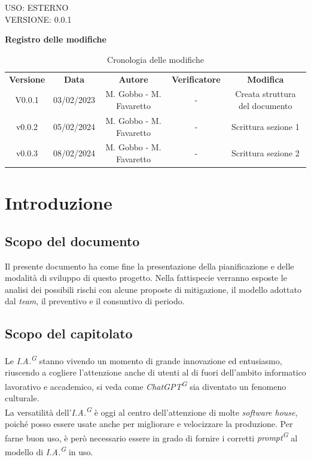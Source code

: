 \documentclass[5pt]{article}
\begin{document}
\begin{flushright}
    \begin{spacing}{1}
        USO: ESTERNO\\
        VERSIONE: 0.0.1\\
    \end{spacing}
\end{flushright}


\restoregeometry

\pagebreak

\textbf{\Large Registro delle modifiche}
\begin{table}[ht]
\centering
\begin{tabular}{|c|c|c|c|c|}
\hline
\textbf{Versione} & \textbf{Data} & \textbf{Autore} & \textbf{Verificatore} & \textbf{Modifica} \\
V0.0.1 & 03/02/2023 & M. Gobbo - M. Favaretto & - & Creata struttura del documento \\
\hline
v0.0.2 & 05/02/2024 & M. Gobbo - M. Favaretto & - & Scrittura sezione 1 \\
\hline
v0.0.3 & 08/02/2024 & M. Gobbo - M. Favaretto & - & Scrittura sezione 2 \\
\hline
\end{tabular}
\caption{Cronologia delle modifiche}
\label{tab:conference}
\end{table}

\pagebreak
\tableofcontents
\pagebreak

\section{Introduzione}
\subsection{Scopo del documento}
Il presente documento ha come fine la presentazione della pianificazione e delle modalità di sviluppo di questo progetto. 
Nella fattispecie verranno esposte le analisi dei possibili rischi con alcune proposte di mitigazione, il modello adottato dal \textit{team}, 
il preventivo e il consuntivo di periodo.

\subsection{Scopo del capitolato}
Le \textit{I.A.\textsuperscript{G}} stanno vivendo un momento di grande innovazione ed entusiasmo, 
riuscendo a cogliere l'attenzione anche di utenti al di fuori dell'ambito informatico lavorativo e accademico, 
si veda come \textit{ChatGPT\textsuperscript{G}} sia diventato un fenomeno culturale. \\
La versatilità dell'\textit{I.A.\textsuperscript{G}} è oggi al centro dell'attenzione di molte \textit{software house}, 
poiché posso essere usate anche per migliorare e velocizzare la produzione. 
Per farne buon uso, è però necessario essere in grado di fornire i corretti \textit{prompt\textsuperscript{G}} al 
modello di \textit{I.A.\textsuperscript{G}} in uso. \\
\end{document}
